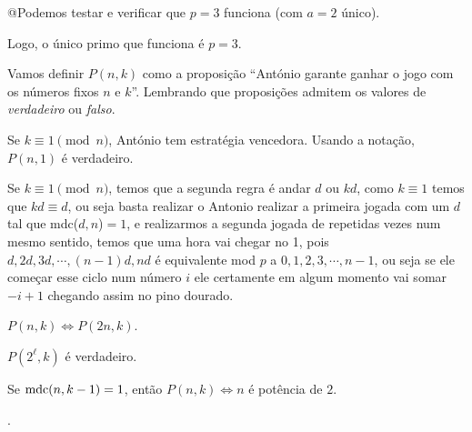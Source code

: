 \documentclass[10pt, a4paper]{article}
\begin{document}
		@Podemos testar e verificar que $p = 3$ funciona (com $a = 2$ único).

		Logo, o único primo que funciona é $ p= 3$.	

	\newpage
	\setcounter{thm}{0}

	Vamos definir $P(n, k)$ como a proposição ``António garante ganhar o jogo com os números fixos $n$ e $k$''. Lembrando que proposições admitem os valores de \emph{verdadeiro} ou \emph{falso}.

	\begin{lem}
		Se $k \equiv 1 \pmod{n}$, António tem estratégia vencedora. Usando a notação, $P(n, 1)$ é verdadeiro.
	\end{lem}

	\begin{dem}
		Se $ k \equiv 1 \pmod n$, temos que a segunda regra é andar $d$ ou $kd$, como $ k \equiv 1$ temos que $ kd \equiv d $, ou seja basta realizar o  Antonio realizar a primeira jogada com um $d$ tal que mdc($d, n$)$= 1$, e realizarmos a segunda jogada de repetidas vezes num mesmo sentido, temos que uma hora vai chegar no 1, pois $ { d, 2d , 3d, \cdots , (n-1)d, nd } $ é equivalente mod $p$ a ${0, 1, 2, 3, \cdots , n-1 } $, ou seja se ele começar esse ciclo num número $i$ ele certamente em algum momento vai somar $-i + 1$ chegando assim no pino dourado.
	\end{dem}

	\begin{lem}
		$P(n, k) \iff P(2n, k)$.	
	\end{lem}

	\begin{lem}
		$P(2^\ell, k)$ é verdadeiro.
	\end{lem}

	\begin{lem}
		Se $\operatorname{mdc}(n, k-1) = 1$, então $P(n, k) \iff n$ é potência de $2$.
	\end{lem}

	\vfill

	.

	\vfill

\end{document}
